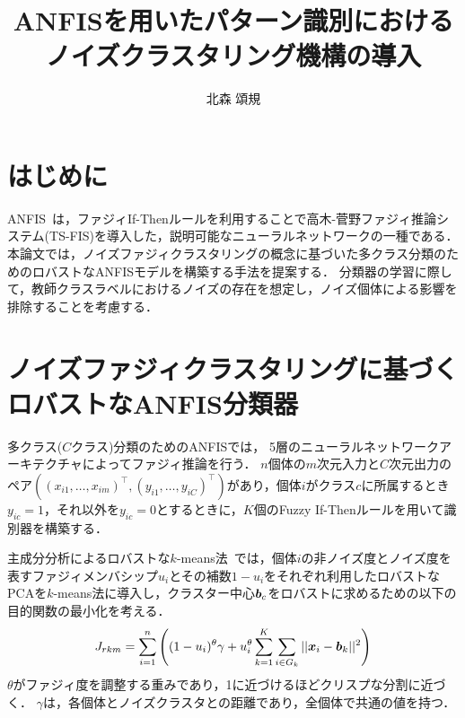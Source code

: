 \documentclass[twoside,twocolumn]{ujarticle}
\title{ANFISを用いたパターン識別における\\ノイズクラスタリング機構の導入}
\author{北森 頌規}
\newcommand{\bmath}[1]{\mbox{\boldmath $#1$}}
\begin{document}
\maketitle
\small
\section{はじめに}
ANFIS~\cite{Jang1993}は，ファジィIf-Thenルールを利用することで高木-菅野ファジィ推論システム(TS-FIS)を導入した，説明可能なニューラルネットワークの一種である．
本論文では，ノイズファジィクラスタリングの概念に基づいた多クラス分類のためのロバストなANFISモデルを構築する手法を提案する．
分類器の学習に際して，教師クラスラベルにおけるノイズの存在を想定し，ノイズ個体による影響を排除することを考慮する．
\section{ノイズファジィクラスタリングに基づく\\ロバストなANFIS分類器}

多クラス($C$クラス)分類のためのANFISでは，
5層のニューラルネットワークアーキテクチャによってファジィ推論を行う．
$n$個体の$m$次元入力と$C$次元出力のペア$((x_{i1}, \dots, x_{im})^\top, (y_{i1}, \dots, y_{iC})^\top)$があり，個体$i$がクラス$c$に所属するとき$y_{ic}=1$，それ以外を$y_{ic}=0$とするときに，$K$個のFuzzy If-Thenルールを用いて識別器を構築する．

\begin{comment}
\begin{figure}[hb]
\centering
\texttt{[image: anfis\_architecture\_classification.pdf]}
\caption{\label{fig: ANFIS_architecture}多クラス分類のためのANFIS構造．}
\end{figure}
\end{comment}


主成分分析によるロバストな$k$-means法~\cite{Honda2010_IEEE-TFS}では，個体$i$の非ノイズ度とノイズ度を表すファジィメンバシップ$u_i$とその補数$1-u_i$をそれぞれ利用したロバストなPCAを$k$-means法に導入し，クラスター中心$\bmath{b}_c$をロバストに求めるための以下の目的関数の最小化を考える．
%
\begin{equation}
	J_{rkm} = \sum_{i=1}^n \left( (1-u_i)^\theta \gamma + u_i^\theta \sum_{k=1}^K \sum_{i \in G_k} || \bmath{x}_i - \bmath{b}_k||^2 \right)
\end{equation}
%
$\theta$がファジィ度を調整する重みであり，1に近づけるほどクリスプな分割に近づく．
$\gamma$は，各個体とノイズクラスタとの距離であり，全個体で共通の値を持つ．
\end{document}
